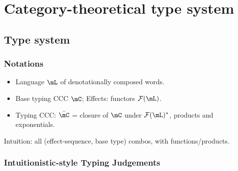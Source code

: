 \documentclass[math, english, info]{beamercours}
\begin{document}
\section{Category-theoretical type system}
\subsection{Type system}
\begin{frame}
	\frametitle{Notations}
	\begin{itemize}
		\item Language $\mL$ of denotationally composed words.
		\item Base typing CCC $\mC$; Effects: functors $\mathcal{F}(\mL)$.
		      \pause
		\item Typing CCC: $\bar{\mC}$ = closure of $\mC$ under $\mathcal{F}(\mL)^{*}$, products and exponentials.
	\end{itemize}
	Intuition: all (effect-sequence, base type) combos, with functions/products.
\end{frame}

\begin{frame}[fragile]
	\frametitle{Intuitionistic-style Typing Judgements}
\end{frame}
\end{document}
